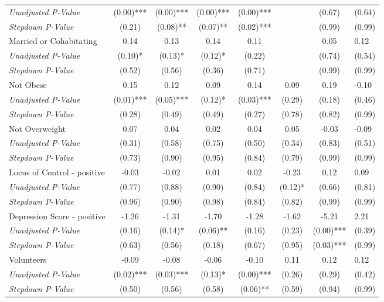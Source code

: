 \begin{tabular}{l c c c c c c}
\quad \textit{Unadjusted P-Value} & (0.00)*** & (0.00)*** & (0.00)*** & (0.00)*** & & (0.67) & (0.64) \\
\quad \textit{Stepdown P-Value} & (0.21) & (0.08)** & (0.07)** & (0.02)*** & & (0.99) & (0.99) \\
Married or Cohabitating & 0.14 & 0.13 & 0.14 & 0.11 & & 0.05 & 0.12 \\
\quad \textit{Unadjusted P-Value} & (0.10)* & (0.13)* & (0.12)* & (0.22) & & (0.74) & (0.54) \\
\quad \textit{Stepdown P-Value} & (0.52) & (0.56) & (0.36) & (0.71) & & (0.99) & (0.99) \\
Not Obese & 0.15 & 0.12 & 0.09 & 0.14 & 0.09 & 0.19 & -0.10 \\
\quad \textit{Unadjusted P-Value} & (0.01)*** & (0.05)*** & (0.12)* & (0.03)*** & (0.29) & (0.18) & (0.46) \\
\quad \textit{Stepdown P-Value} & (0.28) & (0.49) & (0.49) & (0.27) & (0.78) & (0.82) & (0.99) \\
Not Overweight & 0.07 & 0.04 & 0.02 & 0.04 & 0.05 & -0.03 & -0.09 \\
\quad \textit{Unadjusted P-Value} & (0.31) & (0.58) & (0.75) & (0.50) & (0.34) & (0.83) & (0.51) \\
\quad \textit{Stepdown P-Value} & (0.73) & (0.90) & (0.95) & (0.84) & (0.79) & (0.99) & (0.99) \\
Locus of Control - positive & -0.03 & -0.02 & 0.01 & 0.02 & -0.23 & 0.12 & 0.09 \\
\quad \textit{Unadjusted P-Value} & (0.77) & (0.88) & (0.90) & (0.84) & (0.12)* & (0.66) & (0.81) \\
\quad \textit{Stepdown P-Value} & (0.96) & (0.90) & (0.98) & (0.84) & (0.82) & (0.99) & (0.99) \\
Depression Score - positive & -1.26 & -1.31 & -1.70 & -1.28 & -1.62 & -5.21 & 2.21 \\
\quad \textit{Unadjusted P-Value} & (0.16) & (0.14)* & (0.06)** & (0.16) & (0.23) & (0.00)*** & (0.39) \\
\quad \textit{Stepdown P-Value} & (0.63) & (0.56) & (0.18) & (0.67) & (0.95) & (0.03)*** & (0.99) \\
Volunteers & -0.09 & -0.08 & -0.06 & -0.10 & 0.11 & 0.12 & 0.12 \\
\quad \textit{Unadjusted P-Value} & (0.02)*** & (0.03)*** & (0.13)* & (0.00)*** & (0.26) & (0.29) & (0.42) \\
\quad \textit{Stepdown P-Value} & (0.50) & (0.56) & (0.58) & (0.06)** & (0.59) & (0.94) & (0.99) \\

\end{tabular}
